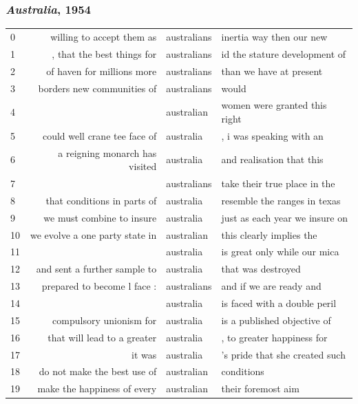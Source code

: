 \documentclass{beamer}       %
\begin{document}
\begin{frame}
	\frametitle{\emph{Australia}, 1954}
\begin{table}
\tiny
\begin{tabular}{lrll}
   0 &        willing to accept them as & australians  & inertia way then our new \\
   1 &       , that the best things for & australians  & id the stature development of \\
   2 &       of haven for millions more & australians  & than we have at present \\
   3 &       borders new communities of & australians  & would \\
   4 &                                  & australian   & women were granted this right \\
   5 &     could well crane tee face of & australia    & , i was speaking with an \\
   6 &   a reigning monarch has visited & australia    & and realisation that this \\
   7 &                                  & australians  & take their true place in the \\
   8 &      that conditions in parts of & australia    & resemble the ranges in texas \\
   9 &        we must combine to insure & australia    & just as each year we insure on \\
  10 &   we evolve a one party state in & australian   & this clearly implies the \\
  11 &                                  & australia    & is great only while our mica \\
  12 &     and sent a further sample to & australia    & that was destroyed \\
  13 &      prepared to become l face : & australians  & and if we are ready and \\
  14 &                                  & australia    & is faced with a double peril \\
  15 &          compulsory unionism for & australia    & is a published objective of \\
  16 &      that will lead to a greater & australia    & , to greater happiness for \\
  17 &                           it was & australia    & 's pride that she created such \\
  18 &      do not make the best use of & australian   & conditions \\
  19 &      make the happiness of every & australian   & their foremost aim \\

\end{tabular}
\end{table}
\end{frame}
\end{document}
